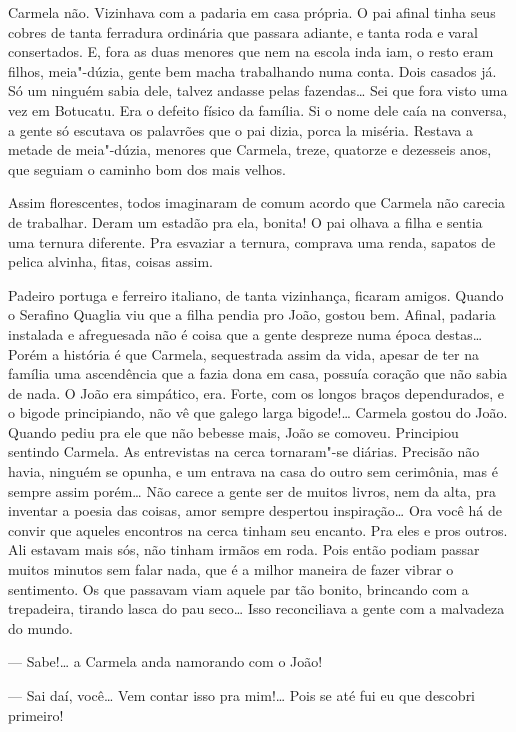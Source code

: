\begin{linenumbers}
Carmela não. Vizinhava com a padaria em casa própria. O pai afinal tinha
seus cobres de tanta ferradura ordinária que passara adiante, e tanta
roda e varal consertados. E, fora as duas menores que nem na escola inda
iam, o resto eram filhos, meia"-dúzia, gente bem macha trabalhando numa
conta. Dois casados já. Só um ninguém sabia dele, talvez andasse pelas
fazendas\ldots{} Sei que fora visto uma vez em Botucatu. Era o defeito físico
da família. Si o nome dele caía na conversa, a gente só escutava os
palavrões que o pai dizia, porca la miséria. Restava a metade de
meia"-dúzia, menores que Carmela, treze, quatorze e dezesseis anos, que
seguiam o caminho bom dos mais velhos.

Assim florescentes, todos imaginaram de comum acordo que Carmela não
carecia de trabalhar. Deram um estadão pra ela, bonita! O pai olhava a
filha e sentia uma ternura diferente. Pra esvaziar a ternura, comprava
uma renda, sapatos de pelica alvinha, fitas, coisas assim.

Padeiro portuga e ferreiro italiano, de tanta vizinhança, ficaram
amigos. Quando o Serafino Quaglia viu que a filha pendia pro João,
gostou bem. Afinal, padaria instalada e afreguesada não é coisa que a
gente despreze numa época destas\ldots{} Porém a história é que Carmela,
sequestrada assim da vida, apesar de ter na família uma ascendência que
a fazia dona em casa, possuía coração que não sabia de nada. O João era
simpático, era. Forte, com os longos braços dependurados, e o bigode
principiando, não vê que galego larga bigode!\ldots{} Carmela gostou do João.
Quando pediu pra ele que não bebesse mais, João se comoveu. Principiou
sentindo Carmela. As entrevistas na cerca tornaram"-se diárias. Precisão
não havia, ninguém se opunha, e um entrava na casa do outro sem
cerimônia, mas é sempre assim porém\ldots{} Não carece a gente ser de muitos
livros, nem da alta, pra inventar a poesia das coisas, amor sempre
despertou inspiração\ldots{} Ora você há de convir que aqueles encontros na
cerca tinham seu encanto. Pra eles e pros outros. Ali estavam mais sós,
não tinham irmãos em roda. Pois então podiam passar muitos minutos sem
falar nada, que é a milhor maneira de fazer vibrar o sentimento. Os que
passavam viam aquele par tão bonito, brincando com a trepadeira, tirando
lasca do pau seco\ldots{} Isso reconciliava a gente com a malvadeza do mundo.

--- Sabe!\ldots{} a Carmela anda namorando com o João!

--- Sai daí, você\ldots{} Vem contar isso pra mim!\ldots{} Pois se até fui eu que
descobri primeiro! 


\end{linenumbers}
